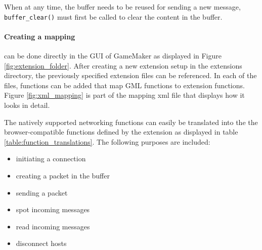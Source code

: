 \documentclass[bsc, 12pt, twoside, singlespacing, parskip, abbrevs, notimes, normalheadings, logo]{styles/infthesis}
\begin{document}
When at any time, the buffer needs to be reused for sending a new message, \texttt{buffer\_clear()} must first be called to clear the content in the buffer. 

\paragraph*{Creating a mapping}
can be done directly in the GUI of GameMaker as displayed in Figure \ref{fig:extension_folder}. After creating a new extension setup in the extensions directory, the previously specified extension files can be referenced. In each of the files, functions can be added that map GML functions to extension functions. Figure \ref{fig:xml_mapping} is part of the mapping xml file that displays how it looks in detail.



The natively supported networking functions can easily be translated into the the browser-compatible functions defined by the extension as displayed in table \ref{table:function_translations}. The following purposes are included:
\begin{itemize}
\item initiating a connection
\item creating a packet in the buffer
\item sending a packet
\item spot incoming messages
\item read incoming messages
\item disconnect hosts
\end{itemize} 
\end{document}
